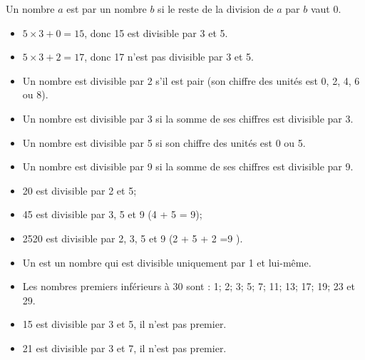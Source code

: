 \begin{myprop}
	Un nombre $a$ est  par un nombre $b$ si le reste de la division de $a$ par $b$ vaut 0. 
\end{myprop}

\begin{myexs}
	\begin{itemize}
		\item $ 5 \times 3 + 0 = 15$, donc 15 est divisible par 3 et 5.
		\item $ 5 \times 3 + 2 = 17$, donc 17 n'est pas divisible par 3 et 5.
	\end{itemize}
\end{myexs}

\begin{myprops}
	\begin{itemize}
		\item Un nombre est divisible par 2 s'il est pair (son chiffre des unités est 0, 2, 4, 6 ou 8).
		\item Un nombre est divisible par 3 si la somme de ses chiffres est divisible par 3.
		\item Un nombre est divisible par 5 si son chiffre des unités est 0 ou 5.
		\item Un nombre est divisible par 9 si la somme de ses chiffres est divisible par 9. 
	\end{itemize}
\end{myprops}

\begin{myexs}
	\begin{itemize}
		\item 20 est divisible par 2 et 5;
		\item 45 est divisible par 3, 5 et 9 (4 + 5 = 9);
		\item 2520 est divisible par 2, 3, 5 et 9 (2 + 5 + 2 =9 ).
	\end{itemize}
\end{myexs}

\begin{myprops}
	\begin{itemize}
		\item Un  est un nombre qui est divisible uniquement par 1 et lui-même.	
		
		\item Les nombres premiers inférieurs à 30 sont : 1; 2; 3; 5; 7; 11; 13; 17; 19; 23 et 29. 
	\end{itemize}
	
\end{myprops}

\begin{myexs}
	\begin{itemize}
		\item 15 est divisible par 3 et 5, il n'est pas premier.
		\item 21 est divisible par 3 et 7, il n'est pas premier.
	\end{itemize}
\end{myexs}